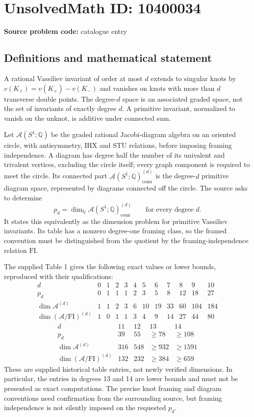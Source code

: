 \documentclass[11pt]{article}
\newcommand{\Q}{\mathbb{Q}}
\begin{document}
\section*{UnsolvedMath ID: 10400034}
\textbf{Source problem code:} catalogue entry
\subsection{Definitions and mathematical statement}
A rational Vassiliev invariant of order at most \(d\) extends to singular knots by \(v(K_\times)=v(K_+)-v(K_-)\) and vanishes on knots with more than \(d\) transverse double points. The degree-\(d\) space is an associated graded space, not the set of invariants of exactly degree \(d\). A primitive invariant, normalized to vanish on the unknot, is additive under connected sum.

Let \(\mathcal A(S^1;\Q)\) be the graded rational Jacobi-diagram algebra on an oriented circle, with antisymmetry, IHX and STU relations, before imposing framing independence. A diagram has degree half the number of its univalent and trivalent vertices, excluding the circle itself; every graph component is required to meet the circle. Its connected part \(\mathcal A(S^1;\Q)^{(d)}_{\mathrm{conn}}\) is the degree-\(d\) primitive diagram space, represented by diagrams connected off the circle. The source asks to determine
\[
 p_d=\dim_\Q\mathcal A(S^1;\Q)^{(d)}_{\mathrm{conn}}
 \qquad\text{for every degree }d.
\]
It states this equivalently as the dimension problem for primitive Vassiliev invariants. Its table has a nonzero degree-one framing class, so the framed convention must be distinguished from the quotient by the framing-independence relation \(\mathrm{FI}\).

The supplied Table 1 gives the following exact values or lower bounds, reproduced with their qualifications:
\[
\begin{array}{c|rrrrrrrrrrr}
 d&0&1&2&3&4&5&6&7&8&9&10\\\hline
 p_d&0&1&1&1&2&3&5&8&12&18&27\\
 \dim\mathcal A^{(d)}&1&1&2&3&6&10&19&33&60&104&184\\
 \dim(\mathcal A/\mathrm{FI})^{(d)}&1&0&1&1&3&4&9&14&27&44&80
\end{array}
\]
\[
\begin{array}{c|rrrr}
 d&11&12&13&14\\\hline
 p_d&39&55&\geq78&\geq108\\
 \dim\mathcal A^{(d)}&316&548&\geq932&\geq1591\\
 \dim(\mathcal A/\mathrm{FI})^{(d)}&132&232&\geq384&\geq659
\end{array}
\]
These are supplied historical table entries, not newly verified dimensions. In particular, the entries in degrees 13 and 14 are lower bounds and must not be presented as exact computations. The precise knot framing and diagram conventions need confirmation from the surrounding source, but framing independence is not silently imposed on the requested \(p_d\).
\end{document}
